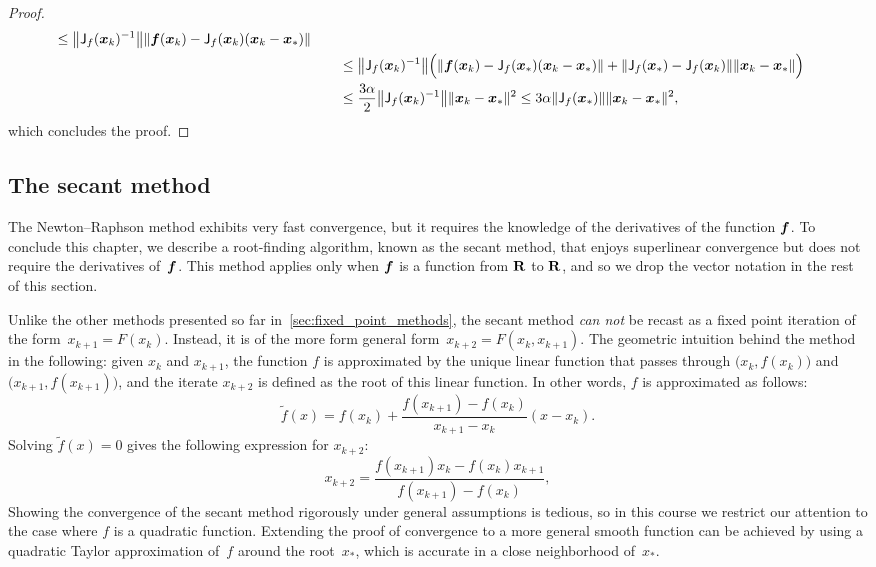 \begin{proof}
\begin{align*}
         \leq \norm*{\mat J_f(\vect x_k)^{-1}} \norm*{\vect f(\vect x_k) - \mat J_f(\vect x_k) (\vect x_k - \vect x_*) } \\
        &\qquad \leq \norm*{\mat J_f(\vect x_k)^{-1}} \Bigl( \norm{\vect f(\vect x_k) - \mat J_f(\vect x_*) (\vect x_k - \vect x_*) } + \norm{\mat J_f(\vect x_*) - \mat J_f(\vect x_k)} \norm{\vect x_k - \vect x_*} \Bigr) \\
        &\qquad \leq \frac{3 \alpha}{2}\norm*{\mat J_f(\vect x_k)^{-1}} \norm{\vect x_k - \vect x_*}^2 \leq 3 \alpha \norm{\mat J_f(\vect x_*)} \norm{\vect x_k - \vect x_*}^2,
    \end{align*}
    which concludes the proof.
\end{proof}

\subsection{The secant method}
The Newton--Raphson method exhibits very fast convergence,
but it requires the knowledge of the derivatives of the function $\mathbf{\boldsymbol{f}}$.
To conclude this chapter,
we describe a root-finding algorithm,
known as the secant method,
that enjoys superlinear convergence but does not require the derivatives of~$\mathbf{\boldsymbol{f}}$.
This method applies only when $\mathbf{\boldsymbol{f}}$ is a function from $\mathbf R$ to $\mathbf R$,
and so we drop the vector notation in the rest of this section.

Unlike the other methods presented so far in~\cref{sec:fixed_point_methods},
the secant method \emph{can not} be recast as a fixed point iteration of the form~$x_{k+1} = F(x_{k})$.
Instead, it is of the more form general form~$x_{k+2} = F(x_k, x_{k+1})$.
The geometric intuition behind the method in the following: given $x_k$ and $x_{k+1}$,
the function $f$ is approximated by the unique linear function that passes through $\bigl(x_k, f(x_k)\bigr)$ and
$\bigl(x_{k+1}, f(x_{k+1})\bigr)$,
and the iterate $x_{k+2}$ is defined as the root of this linear function.
In other words, $f$ is approximated as follows:
\[
    \widetilde f(x) = f(x_k) + \frac{f(x_{k+1}) - f(x_k)}{x_{k+1} - x_k} (x - x_k).
\]
Solving $\widetilde f(x) = 0$ gives the following expression for $x_{k+2}$:
\begin{equation}
    \label{eq:secant_method}
    x_{k+2} = \frac{f(x_{k+1}) x_k - f(x_k) x_{k+1}}{f(x_{k+1}) - f(x_k)},
\end{equation}
Showing the convergence of the secant method rigorously under general assumptions is tedious,
so in this course we restrict our attention to the case where $f$ is a quadratic function.
Extending the proof of convergence to a more general smooth function can be achieved
by using a quadratic Taylor approximation of~$f$ around the root~$x_*$,
which is accurate in a close neighborhood of~$x_*$.

